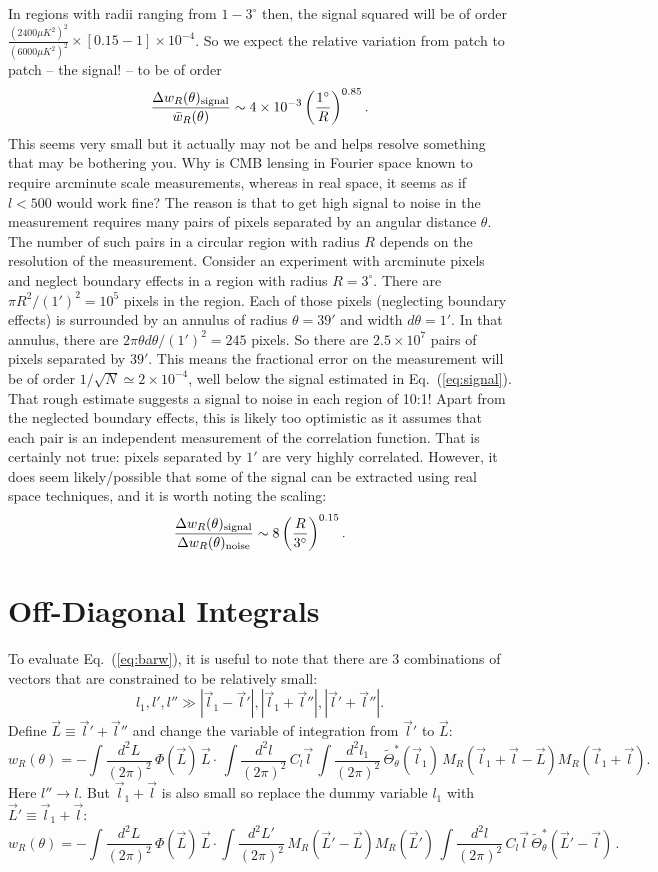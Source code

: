 \documentclass[prd,amsmath,amssymb,floatfix,superscriptaddress,nofootinbib]{revtex4-1}
\def\be{\begin{equation}}
\def\ee{\end{equation}}
\newcommand{\ec}[1]{Eq.~(\ref{eq:#1})}
\newcommand{\eql}[1]{\label{eq:#1}}
\begin{document}
In regions with radii ranging from $1-3^\circ$ then, the signal squared will be of order $\frac{(2400 \mu K^2)^2}{(6000 \mu K^2)^2}\times [0.15-1]\times 10^{-4}$.  So we expect the relative variation from patch to patch -- the signal! -- to be of order
\be
\frac{\Delta w_R(\theta)_{\rm signal}}{\bar w_R(\theta)} \sim 4\times 10^{-3} \left(\frac{1^\circ}{R}\right)^{0.85}.\eql{signal}\ee
This seems very small but it actually may not be and helps resolve something that may be bothering you. Why is CMB lensing in Fourier space known to require arcminute scale measurements, whereas in real space, it seems as if $l<500$ would work fine? The reason is that to get high signal to noise in the measurement requires many pairs of pixels separated by an angular distance $\theta$. The number of such pairs in a circular region with radius $R$ depends on the resolution of the measurement. Consider an experiment with arcminute pixels and neglect boundary effects in a region with radius $R=3^\circ$. There are $\pi R^2/(1')^2=10^5$ pixels in the region. Each of those pixels (neglecting boundary effects) is surrounded by an annulus  of radius $\theta=39'$ and width $d\theta=1'$. In that annulus, there are $2\pi \theta d\theta/(1')^2=245$ pixels. So there are $2.5\times 10^7$ pairs of pixels separated by $39'$. This means the fractional error on the measurement will be of order $1/\sqrt{N}\simeq 2\times 10^{-4}$, well below the signal estimated in \ec{signal}. That rough estimate suggests a signal to noise in each region of 10:1! Apart from the neglected boundary effects, this is likely too optimistic as it assumes that each pair is an independent measurement of the correlation function. That is certainly not true: pixels separated by $1'$ are very highly correlated. However, it does seem likely/possible that some of the signal can be extracted using real space techniques, and it is worth noting the scaling:
\be
\frac{\Delta w_R(\theta)_{\rm signal}}{\Delta w_R(\theta)_{\rm noise}} \sim 8 \left( \frac{R}{3^\circ} \right)^{0.15}.\ee

\appendix
\section{Off-Diagonal Integrals}
To evaluate \ec{barw}, it is useful to note that 
there are 3 combinations of vectors that are constrained to be relatively small:
\be
l_1, l', l'' \gg |\vec l_1-\vec l'|, |\vec l_1+\vec l''|, |\vec l'+\vec l''|.\ee
Define $\vec L\equiv \vec l'+\vec l''$ and change the variable of integration from $\vec l'$ to $\vec L$:
\be
w_R(\theta) =  -\int \frac{d^2L}{(2\pi)^2}\, \Phi(\vec L)\, \vec L \cdot
\,\int \frac{d^2l}{(2\pi)^2}\,C_{l}\vec l\,
\int \frac{d^2l_1}{(2\pi)^2}\, \tilde \Theta_\theta^*(\vec l_1)\, 
 M_R(\vec l_1+\vec l-\vec L)  M_R(\vec l_1+\vec l)
.
\ee
Here $l''\rightarrow l$. But $\vec l_1+\vec l$ is also small so replace the dummy variable $l_1$ with $\vec L'\equiv \vec l_1 + \vec l$:
\be
w_R(\theta) =  -\int \frac{d^2L}{(2\pi)^2}\, \Phi(\vec L)\, \vec L \cdot
\int \frac{d^2L'}{(2\pi)^2}\, M_R(\vec L'-\vec L)  M_R(\vec L')
\,\int \frac{d^2l}{(2\pi)^2}\,C_{l}\vec l\,\tilde \Theta_\theta^*(\vec L'-\vec l)\, 
 .
\ee
\end{document}
